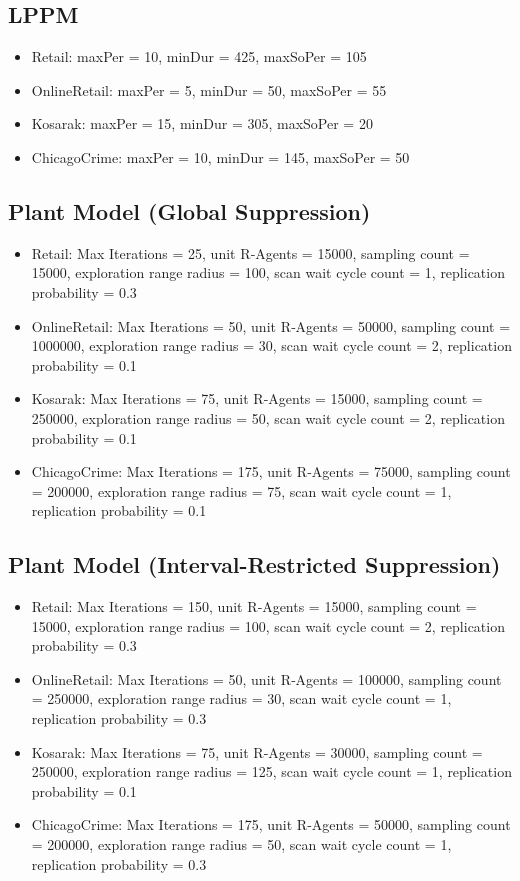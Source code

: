 \subsection{LPPM}
\begin{itemize}
  \item Retail: maxPer = 10, minDur = 425, maxSoPer = 105
  \item OnlineRetail: maxPer = 5,  minDur = 50,  maxSoPer = 55
  \item Kosarak: maxPer = 15, minDur = 305, maxSoPer = 20
  \item ChicagoCrime: maxPer = 10, minDur = 145, maxSoPer = 50
\end{itemize}

\subsection{Plant Model (Global Suppression)}
\begin{itemize}
  \item Retail: Max Iterations = 25, unit R‑Agents = 15000, sampling count = 15000, exploration range radius = 100, scan wait cycle count = 1, replication probability = 0.3
  \item OnlineRetail: Max Iterations = 50, unit R‑Agents = 50000, sampling count = 1000000, exploration range radius = 30, scan wait cycle count = 2, replication probability = 0.1
  \item Kosarak: Max Iterations = 75, unit R‑Agents = 15000, sampling count = 250000, exploration range radius = 50, scan wait cycle count = 2, replication probability = 0.1
  \item ChicagoCrime: Max Iterations = 175, unit R‑Agents = 75000, sampling count = 200000, exploration range radius = 75, scan wait cycle count = 1, replication probability = 0.1
\end{itemize}

\subsection{Plant Model (Interval-Restricted Suppression)}
\begin{itemize}
  \item Retail: Max Iterations = 150, unit R‑Agents = 15000, sampling count = 15000, exploration range radius = 100, scan wait cycle count = 2, replication probability = 0.3
  \item OnlineRetail: Max Iterations = 50, unit R‑Agents = 100000, sampling count = 250000, exploration range radius = 30, scan wait cycle count = 1, replication probability = 0.3
  \item Kosarak: Max Iterations = 75, unit R‑Agents = 30000, sampling count = 250000, exploration range radius = 125, scan wait cycle count = 1, replication probability = 0.1
  \item ChicagoCrime: Max Iterations = 175, unit R‑Agents = 50000, sampling count = 200000, exploration range radius = 50, scan wait cycle count = 1, replication probability = 0.3
\end{itemize}
